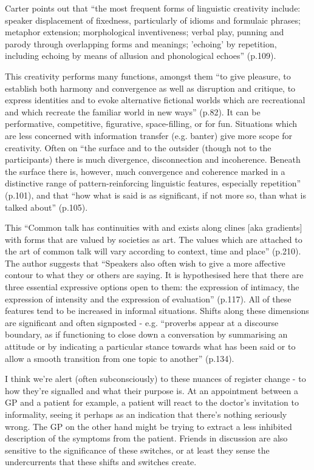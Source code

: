 \documentclass[11pt]{article}
\begin{document}
Carter points out that ``the most frequent forms of linguistic creativity include: speaker displacement of fixedness, particularly of idioms and formulaic phrases; metaphor extension; morphological inventiveness; verbal play, punning and parody through overlapping forms and meanings; 'echoing' by repetition, including echoing by means of allusion and phonological echoes'' (p.109).

This creativity performs many functions, amongst them ``to give pleasure, to establish both harmony and convergence as well as disruption and critique, to express identities and to evoke alternative fictional worlds which are recreational and which recreate the familiar world in new ways'' (p.82). It can be performative, competitive, figurative, space-filling, or for fun. Situations which are less concerned with information transfer (e.g. banter) give more scope for creativity. Often on ``the surface and to the outsider (though not to the participants) there is much divergence, disconnection and incoherence. Beneath the surface there is, however, much convergence and coherence marked in a distinctive range of pattern-reinforcing linguistic features, especially repetition'' (p.101), and that ``how what is said is as significant, if not more so, than what is talked about'' (p.105).


This ``Common talk has continuities with and exists along clines [aka gradients] with forms that are valued by societies as art. The values which are attached to the art of common talk will vary according to context, time and place'' (p.210). The author suggests that ``Speakers also often wish to give a more affective contour to what they or others are saying. It is hypothesised here that there are three essential expressive options open to them: the expression of intimacy, the expression of intensity and the expression of evaluation'' (p.117). All of these features tend to be increased in informal situations. Shifts along these dimensions are significant and often signposted - e.g. ``proverbs appear at a discourse boundary, as if functioning to close down a conversation by summarising an attitude or by indicating a particular stance towards what has been said or to allow a smooth transition from one topic to another'' (p.134).


I think we're alert (often subconsciously) to these nuances of register change - to how they're signalled and what their purpose is. At an appointment between a GP and a patient for example, a patient will react to the doctor's invitation to informality, seeing it perhaps as an indication that there's nothing seriously wrong. The GP on the other hand might be trying to extract a less inhibited description of the symptoms from the patient. Friends in discussion are also sensitive to the significance of these switches, or at least they sense the undercurrents that these shifts and switches create.
\end{document}
